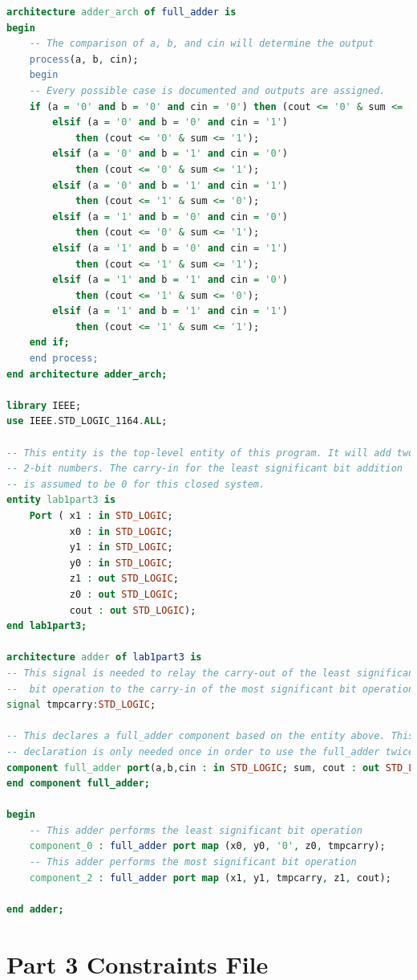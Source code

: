 \documentclass[11pt]{article}
\begin{document}
\begin{appendices}
\begin{lstlisting}[language=VHDL]
architecture adder_arch of full_adder is
begin
    -- The comparison of a, b, and cin will determine the output
    process(a, b, cin);
    begin
    -- Every possible case is documented and outputs are assigned.
    if (a = '0' and b = '0' and cin = '0') then (cout <= '0' & sum <= '0');
		elsif (a = '0' and b = '0' and cin = '1') 
			then (cout <= '0' & sum <= '1');
		elsif (a = '0' and b = '1' and cin = '0') 
			then (cout <= '0' & sum <= '1');
		elsif (a = '0' and b = '1' and cin = '1') 
			then (cout <= '1' & sum <= '0');
		elsif (a = '1' and b = '0' and cin = '0') 
			then (cout <= '0' & sum <= '1');
		elsif (a = '1' and b = '0' and cin = '1') 
			then (cout <= '1' & sum <= '1');
		elsif (a = '1' and b = '1' and cin = '0') 
			then (cout <= '1' & sum <= '0');
		elsif (a = '1' and b = '1' and cin = '1') 
			then (cout <= '1' & sum <= '1');
	end if;
	end process;
end architecture adder_arch;

library IEEE;
use IEEE.STD_LOGIC_1164.ALL;

-- This entity is the top-level entity of this program. It will add two 
-- 2-bit numbers. The carry-in for the least significant bit addition 
-- is assumed to be 0 for this closed system.
entity lab1part3 is
    Port ( x1 : in STD_LOGIC;
           x0 : in STD_LOGIC;
           y1 : in STD_LOGIC;
           y0 : in STD_LOGIC;
           z1 : out STD_LOGIC;
           z0 : out STD_LOGIC;
           cout : out STD_LOGIC);
end lab1part3;

architecture adder of lab1part3 is
-- This signal is needed to relay the carry-out of the least significant
--  bit operation to the carry-in of the most significant bit operation.
signal tmpcarry:STD_LOGIC;

-- This declares a full_adder component based on the entity above. This 
-- declaration is only needed once in order to use the full_adder twice.
component full_adder port(a,b,cin : in STD_LOGIC; sum, cout : out STD_LOGIC);
end component full_adder;

begin
    -- This adder performs the least significant bit operation
    component_0 : full_adder port map (x0, y0, '0', z0, tmpcarry);
    -- This adder performs the most significant bit operation
    component_2 : full_adder port map (x1, y1, tmpcarry, z1, cout);

end adder;
\end{lstlisting}

\section{Part 3 Constraints File}


\end{appendices}
\end{document}
